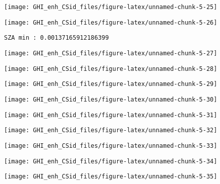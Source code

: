 \documentclass[
  10pt,
  a4paper,oneside]{article}
\begin{document}
\begin{center}\texttt{[image: GHI\_enh\_CSid\_files/figure-latex/unnamed-chunk-5-25]} \end{center}

\begin{center}\texttt{[image: GHI\_enh\_CSid\_files/figure-latex/unnamed-chunk-5-26]} \end{center}

\begin{verbatim}
SZA min : 0.00137165912186399 
\end{verbatim}

\begin{center}\texttt{[image: GHI\_enh\_CSid\_files/figure-latex/unnamed-chunk-5-27]} \end{center}

\begin{center}\texttt{[image: GHI\_enh\_CSid\_files/figure-latex/unnamed-chunk-5-28]} \end{center}

\begin{center}\texttt{[image: GHI\_enh\_CSid\_files/figure-latex/unnamed-chunk-5-29]} \end{center}

\begin{center}\texttt{[image: GHI\_enh\_CSid\_files/figure-latex/unnamed-chunk-5-30]} \end{center}

\begin{center}\texttt{[image: GHI\_enh\_CSid\_files/figure-latex/unnamed-chunk-5-31]} \end{center}

\begin{center}\texttt{[image: GHI\_enh\_CSid\_files/figure-latex/unnamed-chunk-5-32]} \end{center}

\begin{center}\texttt{[image: GHI\_enh\_CSid\_files/figure-latex/unnamed-chunk-5-33]} \end{center}

\begin{center}\texttt{[image: GHI\_enh\_CSid\_files/figure-latex/unnamed-chunk-5-34]} \end{center}

\begin{center}\texttt{[image: GHI\_enh\_CSid\_files/figure-latex/unnamed-chunk-5-35]} \end{center}
\end{document}

